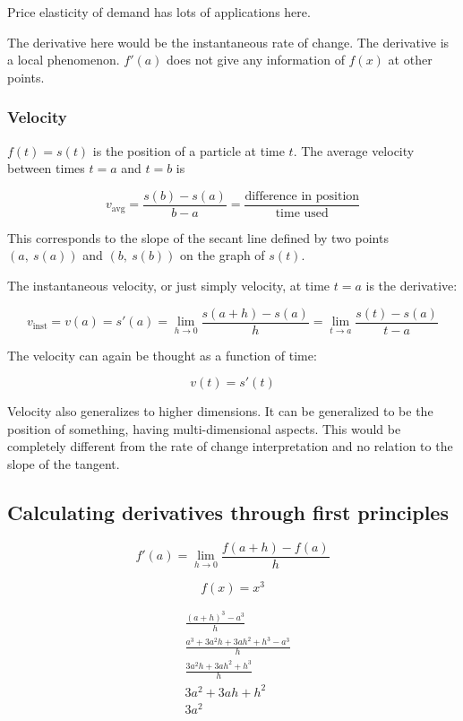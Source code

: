 \documentclass[12pt]{article}
\theoremstyle{plain}
\theoremstyle{remark}
\theoremstyle{definition}
\begin{document}
Price elasticity of demand has lots of applications here.

The derivative here would be the instantaneous rate of change. The
derivative is a local phenomenon. \(f'(a)\) does not give any
information of \(f(x)\) at other points.


\subsubsection{Velocity}

\(f(t) = s(t)\) is the position of a particle at time \(t\). The average
velocity between times \(t = a\) and \(t = b\) is

\[v_{\text{avg}} = \frac{s(b) - s(a)}{b - a} = \frac{\text{difference\ in\ position}}{\text{time\ used}}\]

This corresponds to the slope of the secant line defined by two points
\(\left( a,\ s(a) \right)\) and \(\left( b,\ s(b) \right)\) on the graph
of \(s(t)\).

The instantaneous velocity, or just simply velocity, at time \(t = a\)
is the derivative:

\[v_{\text{inst}} = v(a) = s'(a) = \lim_{h \rightarrow 0}\frac{s(a + h) - s(a)}{h} = \lim_{t \rightarrow a}\frac{s(t) - s(a)}{t - a}\]

The velocity can again be thought as a function of time:

\[v(t) = s'(t)\]

Velocity also generalizes to higher dimensions. It can be generalized to
be the position of something, having multi-dimensional aspects. This
would be completely different from the rate of change interpretation and
no relation to the slope of the tangent.


\subsection{Calculating derivatives through first
principles}

\[f'(a) = \lim_{h \rightarrow 0}\frac{f(a + h) - f(a)}{h}\]

\[f(x) = x^{3}\]

\begin{align*}
&\frac{(a + h)^{3} - a^{3}}{h} \\
&\frac{a^{3} + 3a^{2}h + 3ah^{2} + h^{3} - a^{3}}{h} \\
&\frac{3a^{2}h + 3ah^{2} + h^{3}}{h} \\
&3a^{2} + 3ah + h^{2} \\
&3a^{2}
\end{align*}
\end{document}
